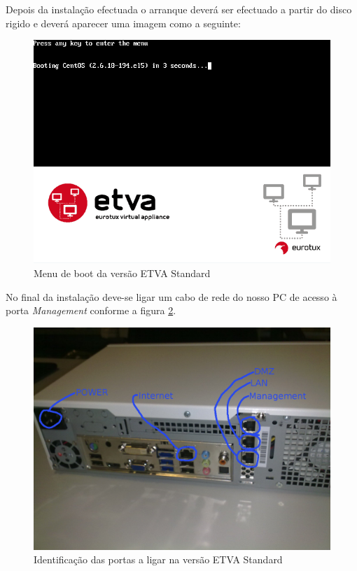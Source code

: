 Depois da instalação efectuada o arranque deverá ser efectuado a partir do disco rigido e deverá aparecer uma imagem como a seguinte:

\begin{figure}[H]
	\begin{center}
	\includegraphics[scale=0.5]{screenshots/install_etva11.png}
	\caption{Menu de boot da versão ETVA Standard}
	\label{fig:boot_screen_standard}
	\end{center}
\end{figure}

No final da instalação deve-se ligar um cabo de rede do nosso PC de acesso à porta \emph{Management} conforme a figura \ref{fig:back_standard}.

\begin{figure}[H]
	\begin{center}
	\includegraphics[scale=0.12]{screenshots/appliance_back_identifica.jpg}
	\caption{Identificação das portas a ligar na versão ETVA Standard}
	\label{fig:back_standard}
	\end{center}
\end{figure}

